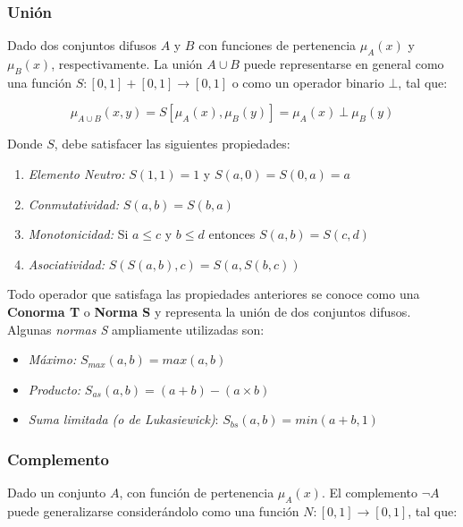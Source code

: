 \subsubsection{Unión}
Dado dos conjuntos difusos $A$ y $B$ con funciones de pertenencia $\mu_A(x)$ y $\mu_B(x)$, respectivamente.
La unión $A \cup B$ puede representarse en general como una función
$S:[0,1] + [0,1] \rightarrow [0,1]$ o como un operador binario $\bot$, tal que:


\begin{displaymath}
\mu_{A \cup B}(x,y) = S \left[ \mu_A(x), \mu_B(y) \right] = \mu_A(x) \ \bot \ \mu_B(y)
\end{displaymath} 

Donde $S$, debe satisfacer las siguientes propiedades:

\begin{enumerate}
	\item \textsl{Elemento Neutro:} $S(1,1)=1$ y $S(a,0) = S(0,a) = a$
	\item \textsl{Conmutatividad:} $S(a,b) = S(b,a)$
	\item \textsl{Monotonicidad:} Si $a \leq c$ y $b \leq d$ entonces $S(a,b) = S(c,d)$
	\item \textsl{Asociatividad:} $S(S(a,b),c) = S(a,S(b,c))$
\end{enumerate}


Todo operador que satisfaga las propiedades anteriores se conoce como una \textbf{Conorma T} o \textbf{Norma S} y representa la unión de dos conjuntos difusos. Algunas \textit{normas S} ampliamente utilizadas son:

\begin{itemize}
	\item \textsl{Máximo:} $S_{max}(a,b) = max(a,b)$
	\item \textsl{Producto:} $S_{as}(a,b) = (a+b) - (a \times b)$
	\item \textsl{Suma limitada (o de Lukasiewick)}: $S_{bs}(a,b) = min(a+b,1)$
\end{itemize}

\subsubsection{Complemento}
Dado un conjunto $A$, con función de pertenencia $\mu_A(x)$.
El complemento $\neg A$ puede generalizarse considerándolo como una función
$N:[0,1] \rightarrow [0,1]$, tal que:


